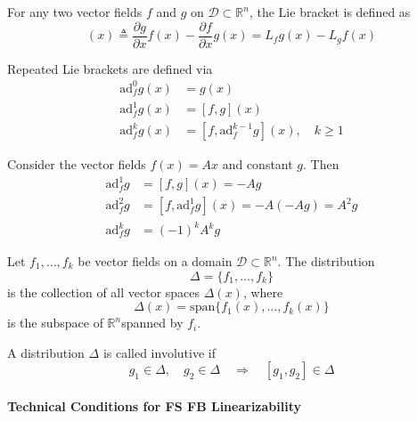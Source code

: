 
For any two vector fields $f$ and $g$ on $\mathcal{D} \subset \mathbb{R}^n$, the Lie bracket is defined as
\begin{equation*}
    [f, g](x) \triangleq \frac{\partial g}{\partial x} f(x) - \frac{\partial f}{\partial x} g(x) = L_f g(x) - L_g f(x)
\end{equation*}

Repeated Lie brackets are defined via
\begin{align*}
    \text{ad}_f^0 g(x) & = g(x)                                        \\
    \text{ad}_f^1 g(x) & = [f, g](x)                                   \\
    \text{ad}_f^k g(x) & = [f, \text{ad}_f^{k-1} g](x), \quad k \geq 1
\end{align*}

\newpar{}

Consider the vector fields $f(x) = Ax$ and constant $g$. Then
\begin{align*}
    \text{ad}_f^1 g & = [f, g](x) = -Ag                           \\
    \text{ad}_f^2 g & = [f, \text{ad}_f^1 g](x) = -A(-Ag) = A^2 g \\
    \text{ad}_f^k g & = {(-1)}^k A^k g
\end{align*}

\newpar{}

Let $f_1, \ldots, f_k$ be vector fields on a domain $\mathcal{D} \subset \mathbb{R}^n$. The distribution
\begin{equation*}
    \Delta = \{f_1, \ldots, f_k\}
\end{equation*}
is the collection of all vector spaces $\Delta(x)$, where
\begin{equation*}
    \Delta(x) = \text{span}\{f_1(x), \ldots, f_k(x)\}
\end{equation*}
is the subspace of $\mathbb{R}^n $spanned by $f_i$.

\newpar{}

A distribution $\Delta$ is called involutive if
\begin{equation*}
    g_1 \in \Delta, \quad g_2 \in \Delta \quad \Rightarrow \quad [g_1, g_2] \in \Delta
\end{equation*}

\paragraph{Technical Conditions for FS FB Linearizability}

